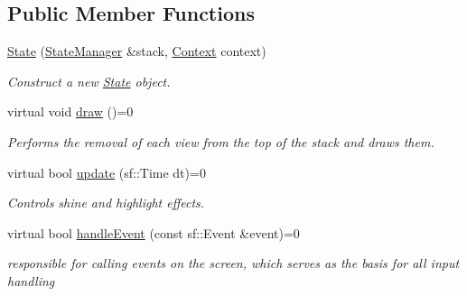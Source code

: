 \subsection*{Public Member Functions}
\begin{DoxyCompactItemize}
\item 
\hyperlink{classState_adc4beeb07281ceb685f87f5ccba73057}{State} (\hyperlink{classStateManager}{State\+Manager} \&stack, \hyperlink{structState_1_1Context}{Context} context)
\begin{DoxyCompactList}\small\item\em Construct a new \hyperlink{classState}{State} object. \end{DoxyCompactList}\item 
\mbox{\label{classState_ae261605bc40b7e3959ce5df5457e4942}} 
virtual void \hyperlink{classState_ae261605bc40b7e3959ce5df5457e4942}{draw} ()=0
\begin{DoxyCompactList}\small\item\em Performs the removal of each view from the top of the stack and draws them. \end{DoxyCompactList}\item 
virtual bool \hyperlink{classState_acd5926bc7a373edff9e57f3ffe94ca13}{update} (sf\+::\+Time dt)=0
\begin{DoxyCompactList}\small\item\em Controls shine and highlight effects. \end{DoxyCompactList}\item 
virtual bool \hyperlink{classState_a19965f83460b248c42952aac8d001206}{handle\+Event} (const sf\+::\+Event \&event)=0
\begin{DoxyCompactList}\small\item\em responsible for calling events on the screen, which serves as the basis for all input handling \end{DoxyCompactList}\end{DoxyCompactItemize}
